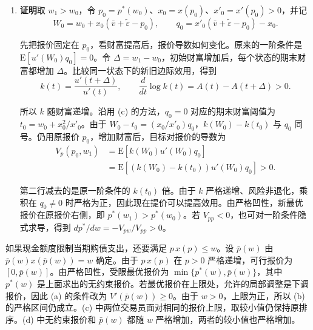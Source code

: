 \begin{solution}[blank-type=manual,blank-vsep=12\baselineskip]
\begin{enumerate}[label=(\alph*)]
对一般的状态，
\[
 W_2-t_2=\frac{x_2}{x'_2}q_2.
\]

因此 $W_2-t_2$ 与 $q_2$ 同号。令 $k_0=f'(u_2(t_2))$。由于 $f'$ 递减且 $u_2$ 递增，财富高于阈值时 $f'(u_2(W_2))$ 低于 $k_0$，财富低于阈值时则相反，所以
\[
 [f'(u_2(W_2))-k_0]q_2\le0.
\]

由交易员 2 的一阶条件，$\mathrm E[u_2'(W_2)q_2]=0$，可以从交易员 1 的导数中减去 $k_0$ 倍的这一项。于是
\[
\begin{aligned}
 V_1'(p_2^*)&=\mathrm E[f'(u_2(W_2))u_2'(W_2)q_2]\\
 &=\mathrm E[(f'(u_2(W_2))-k_0)u_2'(W_2)q_2]\le0.
\end{aligned}
\]

在 $p_2^*$ 处，交易员 1 的报价导数已非正。目标函数严格凹，继续提高报价只会降低效用，所以 $p_1^*\le p_2^*$。

\item \textbf{证明}\quad 取 $w_1>w_0$，令 $p_0=p^*(w_0)$、$x_0=x(p_0)$、$x'_0=x'(p_0)>0$，并记
\[
 W_0=w_0+x_0(\bar v+\tilde\varepsilon-p_0),\qquad
 q_0=x'_0(\bar v+\tilde\varepsilon-p_0)-x_0.
\]

先把报价固定在 $p_0$，看财富提高后，报价导数如何变化。原来的一阶条件是 $\mathrm E[u'(W_0)q_0]=0$。令 $\Delta=w_1-w_0$，初始财富增加后，每个状态的期末财富都增加 $\Delta$。比较同一状态下的新旧边际效用，得到
\[
 k(t)=\frac{u'(t+\Delta)}{u'(t)},\qquad
 \frac{d}{dt}\log k(t)=A(t)-A(t+\Delta)>0.
\]

所以 $k$ 随财富递增。沿用 (c) 的方法，$q_0=0$ 对应的期末财富阈值为 $t_0=w_0+x_0^2/x'_0$。由于 $W_0-t_0=(x_0/x'_0)q_0$，$k(W_0)-k(t_0)$ 与 $q_0$ 同号。仍用原报价 $p_0$，增加财富后，目标对报价的导数为
\[
\begin{aligned}
 V_p(p_0,w_1)
 &=\mathrm E[k(W_0)u'(W_0)q_0]\\
 &=\mathrm E[(k(W_0)-k(t_0))u'(W_0)q_0]>0.
\end{aligned}
\]

第二行减去的是原一阶条件的 $k(t_0)$ 倍。由于 $k$ 严格递增、风险非退化，乘积在 $q_0\ne0$ 时严格为正，因此现在提价可以提高效用。由严格凹性，新最优报价在原报价右侧，即 $p^*(w_1)>p^*(w_0)$。若 $V_{pp}<0$，也可对一阶条件隐式求导，得到 $dp^*/dw=-V_{pw}/V_{pp}>0$。
\end{enumerate}

如果现金额度限制当期购债支出，还要满足 $p\,x(p)\le w$。设 $\bar p(w)$ 由 $\bar p(w)x(\bar p(w))=w$ 确定。由于 $p\,x(p)$ 在 $p>0$ 严格递增，可行报价为 $[0,\bar p(w)]$。由严格凹性，受限最优报价为 $\min\{p^*(w),\bar p(w)\}$，其中 $p^*(w)$ 是上面求出的无约束报价。若最优报价在上限处，允许的局部调整是下调报价，因此 (a) 的条件改为 $V'(\bar p(w))\ge0$。由于 $w>0$，上限为正，所以 (b) 的严格区间仍成立。(c) 中两位交易员面对相同的报价上限，取较小值仍保持原排序。(d) 中无约束报价和 $\bar p(w)$ 都随 $w$ 严格增加，两者的较小值也严格增加。\qedhere
\end{solution}
